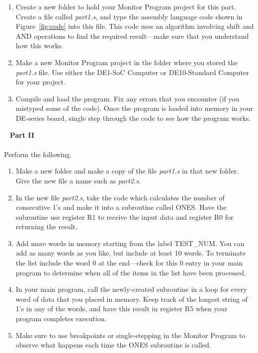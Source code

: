 \documentclass[epsfig,10pt,fullpage]{article}
\begin{document}
\begin{enumerate}
\item Create a new folder to hold your Monitor Program project for this part. Create a
file called {\it part1.s}, and type the assembly language code shown in 
Figure~\ref{fig:code} into this
file. This code uses an algorithm involving shift and AND operations to find the required 
result---make sure that you understand how this works.

\item
Make a new Monitor Program project in the folder where you stored the {\it part1.s} file.
Use either the DE1-SoC Computer or DE10-Standard Computer for your project.
\item
Compile and load the program. Fix any errors that you encounter (if you mistyped some of
the code). Once the program is loaded into memory in your DE-series board, single step
through the code to see how the program works.
\end{enumerate}
\
\noindent
{\bf Part II}
~\\
~\\
\noindent
Perform the following.
\begin{enumerate}
\item Make a new folder and make a copy of the file {\it part1.s} in that new folder. Give
the new file a name such as {\it part2.s}.
\item In the new file {\it part2.s}, take the code which calculates the 
number of consecutive 1's and make it into a subroutine called ONES. Have the subroutine use 
register R1 to receive the input data and register R0 for returning the result.
\item Add more words in memory starting from the label TEST\_NUM. You can add as many
words as you like, but include at least 10 words. To terminate the list include the word 0
at the end---check for this 0 entry in your main program to determine when all of the
items in the list have been processed.
\item In your main program, call the newly-created subroutine in a loop for every word of 
data that you placed in memory. Keep track of the longest string of 1's in any of the words, 
and have this result in register R5 when your program completes execution. 
\item Make sure to use breakpoints or single-stepping in the Monitor Program to observe what 
happens each time the ONES subroutine is called.
\end{enumerate}
\end{document}
